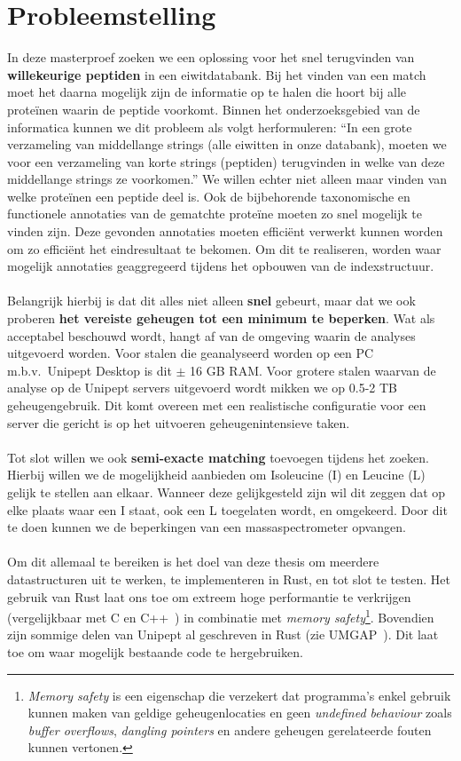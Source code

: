 \section{Probleemstelling}\label{sec:probleemstelling}
In deze masterproef zoeken we een oplossing voor het snel terugvinden van \textbf{willekeurige peptiden} in een eiwitdatabank.
Bij het vinden van een match moet het daarna mogelijk zijn de informatie op te halen die hoort bij alle proteïnen waarin de peptide voorkomt.
Binnen het onderzoeksgebied van de informatica kunnen we dit probleem als volgt herformuleren:
``In een grote verzameling van middellange strings (alle eiwitten in onze databank), moeten we voor een verzameling van korte strings (peptiden) terugvinden in welke van deze middellange strings ze voorkomen.''
We willen echter niet alleen maar vinden van welke proteïnen een peptide deel is.
Ook de bijbehorende taxonomische en functionele annotaties van de gematchte proteïne moeten zo snel mogelijk te vinden zijn.
Deze gevonden annotaties moeten efficiënt verwerkt kunnen worden om zo efficiënt het eindresultaat te bekomen.
Om dit te realiseren, worden waar mogelijk annotaties geaggregeerd tijdens het opbouwen van de indexstructuur.
\\ \\
Belangrijk hierbij is dat dit alles niet alleen \textbf{snel} gebeurt, maar dat we ook proberen \textbf{het vereiste geheugen tot een minimum te beperken}.
Wat als acceptabel beschouwd wordt, hangt af van de omgeving waarin de analyses uitgevoerd worden.
Voor stalen die geanalyseerd worden op een PC m.b.v.~Unipept Desktop is dit $\pm$ 16 GB RAM\@.
Voor grotere stalen waarvan de analyse op de Unipept servers uitgevoerd wordt mikken we op 0.5-2 TB geheugengebruik.
Dit komt overeen met een realistische configuratie voor een server die gericht is op het uitvoeren geheugenintensieve taken.
\\ \\
Tot slot willen we ook \textbf{semi-exacte matching} toevoegen tijdens het zoeken.
Hierbij willen we de mogelijkheid aanbieden om Isoleucine (I) en Leucine (L) gelijk te stellen aan elkaar.
Wanneer deze gelijkgesteld zijn wil dit zeggen dat op elke plaats waar een I staat, ook een L toegelaten wordt, en omgekeerd.
Door dit te doen kunnen we de beperkingen van een massaspectrometer opvangen.
\\ \\
Om dit allemaal te bereiken is het doel van deze thesis om meerdere datastructuren uit te werken, te implementeren in Rust, en tot slot te testen.
Het gebruik van Rust laat ons toe om extreem hoge performantie te verkrijgen (vergelijkbaar met C en C++~\cite{rustPerformantie}) in combinatie met \textit{memory safety}\footnote{\textit{Memory safety} is een eigenschap die verzekert dat programma's enkel gebruik kunnen maken van geldige geheugenlocaties en geen \textit{undefined behaviour} zoals \textit{buffer overflows}, \textit{dangling pointers} en andere geheugen gerelateerde fouten kunnen vertonen.}.
Bovendien zijn sommige delen van Unipept al geschreven in Rust (zie UMGAP~\cite{UMGAP_paper, UMGAP_source}).
Dit laat toe om waar mogelijk bestaande code te hergebruiken.



